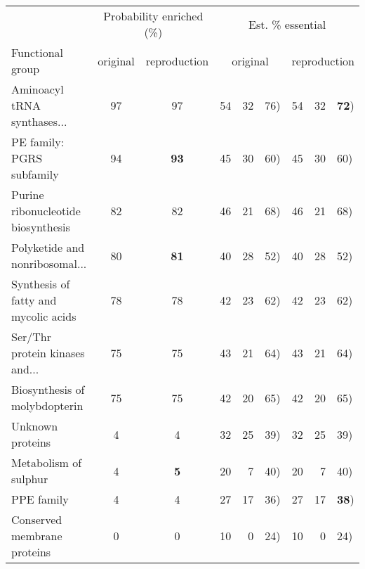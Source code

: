 \begin{tabular}{lccc@{ (}r@{--}lc@{ (}r@{--}l}
  \hline
  & \multicolumn{2}{c}{Probability enriched (\%)} & \multicolumn{6}{c}{Est. \% essential}\\ Functional group & original & reproduction & \multicolumn{3}{c}{original} & \multicolumn{3}{c}{reproduction}\\ \hline
Aminoacyl tRNA synthases... & 97 & 97 & 54 & 32 & 76) & 54 & 32 & \textbf{72}) \\ 
  PE family: PGRS subfamily & 94 & \textbf{93} & 45 & 30 & 60) & 45 & 30 & 60) \\ 
  Purine ribonucleotide biosynthesis & 82 & 82 & 46 & 21 & 68) & 46 & 21 & 68) \\ 
  Polyketide and nonribosomal... & 80 & \textbf{81} & 40 & 28 & 52) & 40 & 28 & 52) \\ 
  Synthesis of fatty and mycolic acids & 78 & 78 & 42 & 23 & 62) & 42 & 23 & 62) \\ 
  Ser/Thr protein kinases and... & 75 & 75 & 43 & 21 & 64) & 43 & 21 & 64) \\ 
  Biosynthesis of molybdopterin & 75 & 75 & 42 & 20 & 65) & 42 & 20 & 65) \\ 
  Unknown proteins & 4 & 4 & 32 & 25 & 39) & 32 & 25 & 39) \\ 
  Metabolism of sulphur & 4 & \textbf{5} & 20 & 7 & 40) & 20 & 7 & 40) \\ 
  PPE family & 4 & 4 & 27 & 17 & 36) & 27 & 17 & \textbf{38}) \\ 
  Conserved membrane proteins & 0 & 0 & 10 & 0 & 24) & 10 & 0 & 24) \\ 
   \hline
\end{tabular}
